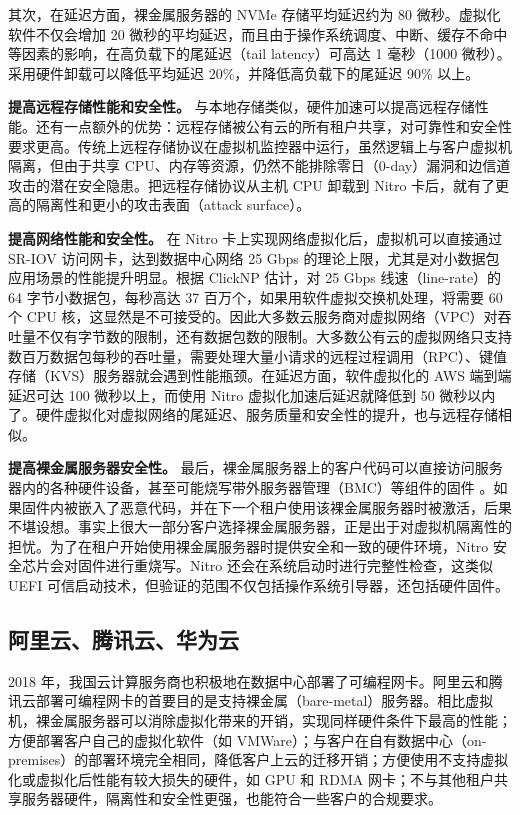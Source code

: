 其次，在延迟方面，裸金属服务器的 NVMe 存储平均延迟约为 80 微秒。虚拟化软件不仅会增加 20 微秒的平均延迟，而且由于操作系统调度、中断、缓存不命中等因素的影响，在高负载下的尾延迟（tail latency）可高达 1 毫秒（1000 微秒）。采用硬件卸载可以降低平均延迟 20\%，并降低高负载下的尾延迟 90\% 以上。

\textbf{提高远程存储性能和安全性。}
与本地存储类似，硬件加速可以提高远程存储性能。还有一点额外的优势：远程存储被公有云的所有租户共享，对可靠性和安全性要求更高。传统上远程存储协议在虚拟机监控器中运行，虽然逻辑上与客户虚拟机隔离，但由于共享 CPU、内存等资源，仍然不能排除零日（0-day）漏洞和边信道攻击的潜在安全隐患。把远程存储协议从主机 CPU 卸载到 Nitro 卡后，就有了更高的隔离性和更小的攻击表面（attack surface）。

\textbf{提高网络性能和安全性。}
在 Nitro 卡上实现网络虚拟化后，虚拟机可以直接通过 SR-IOV 访问网卡，达到数据中心网络 25 Gbps 的理论上限，尤其是对小数据包应用场景的性能提升明显。根据 ClickNP \cite{li2016clicknp} 估计，对 25 Gbps 线速（line-rate）的 64 字节小数据包，每秒高达 37 百万个，如果用软件虚拟交换机处理，将需要 60 个 CPU 核，这显然是不可接受的。因此大多数云服务商对虚拟网络（VPC）对吞吐量不仅有字节数的限制，还有数据包数的限制。大多数公有云的虚拟网络只支持数百万数据包每秒的吞吐量，需要处理大量小请求的远程过程调用（RPC）、键值存储（KVS）服务器就会遇到性能瓶颈。在延迟方面，软件虚拟化的 AWS 端到端延迟可达 100 微秒以上，而使用 Nitro 虚拟化加速后延迟就降低到 50 微秒以内了。硬件虚拟化对虚拟网络的尾延迟、服务质量和安全性的提升，也与远程存储相似。

\textbf{提高裸金属服务器安全性。}
最后，裸金属服务器上的客户代码可以直接访问服务器内的各种硬件设备，甚至可能烧写带外服务器管理（BMC）等组件的固件 \cite{bare-metal-security}。如果固件内被嵌入了恶意代码，并在下一个租户使用该裸金属服务器时被激活，后果不堪设想。事实上很大一部分客户选择裸金属服务器，正是出于对虚拟机隔离性的担忧。为了在租户开始使用裸金属服务器时提供安全和一致的硬件环境，Nitro 安全芯片会对固件进行重烧写。Nitro 还会在系统启动时进行完整性检查，这类似 UEFI 可信启动技术，但验证的范围不仅包括操作系统引导器，还包括硬件固件。

\subsection{阿里云、腾讯云、华为云}

2018 年，我国云计算服务商也积极地在数据中心部署了可编程网卡。阿里云和腾讯云部署可编程网卡的首要目的是支持裸金属（bare-metal）服务器。相比虚拟机，裸金属服务器可以消除虚拟化带来的开销，实现同样硬件条件下最高的性能；方便部署客户自己的虚拟化软件（如 VMWare）；与客户在自有数据中心（on-premises）的部署环境完全相同，降低客户上云的迁移开销；方便使用不支持虚拟化或虚拟化后性能有较大损失的硬件，如 GPU 和 RDMA 网卡；不与其他租户共享服务器硬件，隔离性和安全性更强，也能符合一些客户的合规要求。

